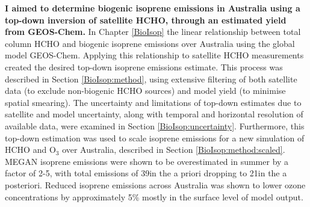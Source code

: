    
  \textbf{I aimed to determine biogenic isoprene emissions in Australia using a top-down inversion of satellite HCHO, through an estimated yield from GEOS-Chem.}
  In Chapter \ref{BioIsop} the linear relationship between total column HCHO and biogenic isoprene emissions over Australia  using the global model GEOS-Chem.
  Applying this relationship to satellite HCHO measurements created the desired top-down isoprene emissions estimate.
  This process was described in Section \ref{BioIsop:method}, using extensive filtering of both satellite data (to exclude non-biogenic HCHO sources) and model yield (to minimise spatial smearing).
  The uncertainty and limitations of top-down estimates due to satellite and model uncertainty, along with temporal and horizontal resolution of available data, were examined in Section \ref{BioIsop:uncertainty}.
  Furthermore, this top-down estimation was used to scale isoprene emissions for a new simulation of HCHO and O$_3$ over Australia, described in Section \ref{BioIsop:method:scaled}.
  MEGAN isoprene emissions were shown to be overestimated in summer by a factor of 2-5, with total emissions of 39\tgpyr in the a priori dropping to 21\tgpyr in the a posteriori.
  Reduced isoprene emissions across Australia was shown to lower ozone concentrations by approximately 5\% mostly in the surface level of model output.
   
